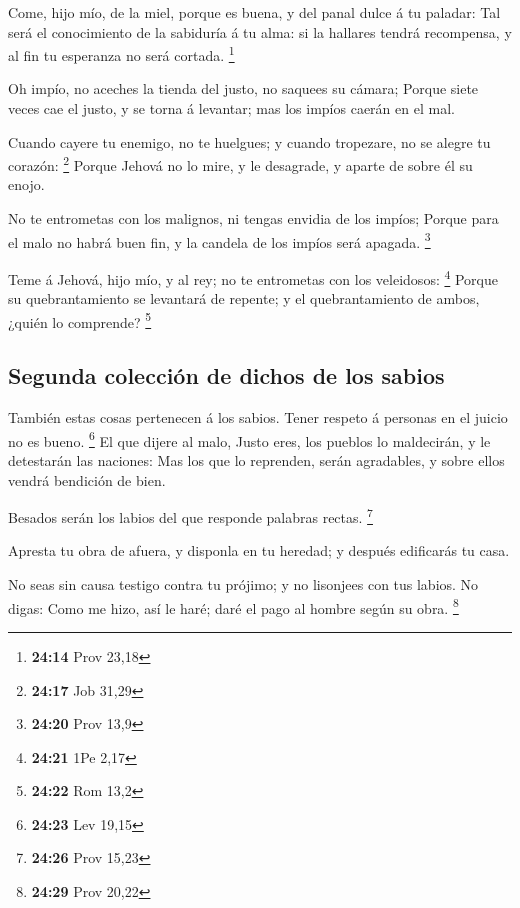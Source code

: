 Come, hijo mío, de la miel, porque es buena, y del panal
dulce á tu paladar:  Tal será el conocimiento de la
sabiduría á tu alma: si la hallares tendrá recompensa, y al fin tu
esperanza no será cortada. \footnote{\textbf{24:14} Prov 23,18}

 Oh impío, no aceches la tienda del justo, no saquees su
cámara;  Porque siete veces cae el justo, y se torna á
levantar; mas los impíos caerán en el mal.

 Cuando cayere tu enemigo, no te huelgues; y cuando
tropezare, no se alegre tu corazón: \footnote{\textbf{24:17} Job 31,29}
 Porque Jehová no lo mire, y le desagrade, y aparte de
sobre él su enojo.

 No te entrometas con los malignos, ni tengas envidia de
los impíos;  Porque para el malo no habrá buen fin, y la
candela de los impíos será apagada. \footnote{\textbf{24:20} Prov 13,9}

 Teme á Jehová, hijo mío, y al rey; no te entrometas con
los veleidosos: \footnote{\textbf{24:21} 1Pe 2,17}  Porque
su quebrantamiento se levantará de repente; y el quebrantamiento de
ambos, ¿quién lo comprende? \footnote{\textbf{24:22} Rom 13,2}

\hypertarget{segunda-colecciuxf3n-de-dichos-de-los-sabios}{%
\subsection{Segunda colección de dichos de los
sabios}\label{segunda-colecciuxf3n-de-dichos-de-los-sabios}}

 También estas cosas pertenecen á los sabios. Tener respeto
á personas en el juicio no es bueno. \footnote{\textbf{24:23} Lev 19,15}
 El que dijere al malo, Justo eres, los pueblos lo
maldecirán, y le detestarán las naciones:  Mas los que lo
reprenden, serán agradables, y sobre ellos vendrá bendición de bien.

 Besados serán los labios del que responde palabras rectas.
\footnote{\textbf{24:26} Prov 15,23}

 Apresta tu obra de afuera, y disponla en tu heredad; y
después edificarás tu casa.

 No seas sin causa testigo contra tu prójimo; y no
lisonjees con tus labios.  No digas: Como me hizo, así le
haré; daré el pago al hombre según su obra. \footnote{\textbf{24:29}
  Prov 20,22}

